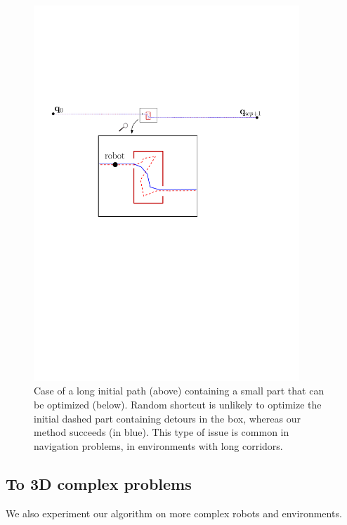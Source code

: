 \documentclass{tADR2e}
\begin{document}
\begin{figure}
	\centering
	\includegraphics[width=10cm]{local_box_optim.pdf}
	\caption{Case of a long initial path (above) containing a small part 
	that can 
	be optimized (below). Random shortcut is unlikely to optimize the initial 
	dashed part containing detours in the box, whereas our method 
	succeeds (in blue). This type of issue is common in navigation problems, in 
	environments with long corridors.}
	\label{local_box_optim}
\end{figure}



\subsection{To 3D complex problems}

We also experiment our algorithm on more complex robots and environments.
\end{document}
